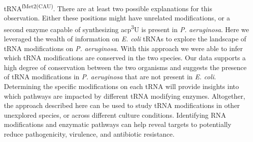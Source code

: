 \documentclass[times, twoside]{zHenriquesLab-StyleBioRxiv}
\begin{document}
tRNA\textsuperscript{fMet2}\textsuperscript{(}\textsuperscript{CAU}\textsuperscript{)}. There are at least two possible explanations for this observation. Either these positions might have unrelated modifications, or a second enzyme capable of synthesizing acp\textsuperscript{3}U is present in \textit{P. aeruginosa}. 
\newline
\newline
Here we leveraged the wealth of information on \textit{E. coli} tRNAs to explore the landscape of tRNA modifications on \textit{P. aeruginosa}. With this approach we were able to infer which tRNA modifications are conserved in the two species. Our data supports a high degree of conservation between the two organisms and suggests the presence of tRNA modifications in \textit{P. aeruginosa} that are not present in \textit{E. coli}. Determining the specific modifications on each tRNA will provide insights into which pathways are impacted by different tRNA modifying enzymes. Altogether, the approach described here can be used to study tRNA modifications in other unexplored species, or across different culture conditions. Identifying RNA modifications and enzymatic pathways can help reveal targets to potentially reduce pathogenicity, virulence, and antibiotic resistance. 
\end{document}
